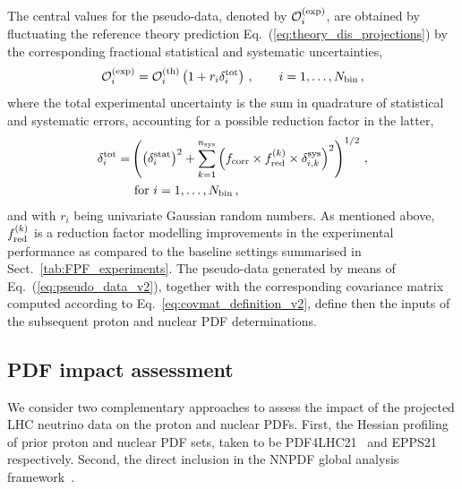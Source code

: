 The central values for the pseudo-data, denoted by $\mathcal{O}_i^{{\rm (exp)}} $, are obtained
by fluctuating the reference theory prediction Eq.~(\ref{eq:theory_dis_projections})
by the corresponding fractional statistical and systematic
uncertainties,
\begin{equation}
	\label{eq:pseudo_data_v2}
	\mathcal{O}_i^{{\rm (exp)}}
	= \mathcal{O}_i^{{\rm (th)}}
	\left( 1+ r_i \delta_i^{\rm tot}
	\right) \,
	, \qquad i=1,\ldots,N_{\rm bin} \, ,
\end{equation}
where the total experimental uncertainty is the sum in quadrature of
statistical and systematic errors, accounting for a possible reduction
factor in the latter,
\begin{align}
	\delta_{i}^{\rm tot}
	= & \left( \left( \delta_i^{\rm stat}\right)^2 + \sum_{k=1}^{n_{\rm sys}}
	\left( f_{\rm corr} \times f_{\rm red}^{(k)} \times \delta_{i,k}^{\rm sys} \right)^2\right)^{1/2} \, , \nonumber\\
	& \text{ for } i=1,\ldots,N_{\rm bin} \, ,
\end{align}
and with $r_{i}$ being univariate Gaussian random numbers. 
%
As mentioned above, $f_{\rm red}^{(k)}$ is a reduction factor modelling
improvements in the experimental performance as compared to the baseline
settings summarised in Sect.~\ref{tab:FPF_experiments}.
%
The pseudo-data generated by means of Eq.~(\ref{eq:pseudo_data_v2}),
together with the corresponding covariance matrix computed according to Eq.~\eqref{eq:covmat_definition_v2},
define then the inputs of the subsequent proton and nuclear PDF determinations.

 \subsection{PDF impact assessment}
 \label{subsec:pdf_impact_assessment}

We consider two complementary approaches to assess the
impact of the projected LHC neutrino data on the proton and nuclear PDFs.
%
First, the Hessian profiling\cite{Paukkunen:2014zia, Schmidt:2018hvu, AbdulKhalek:2018rok, HERAFitterdevelopersTeam:2015cre} of prior proton and
nuclear PDF sets, taken to be PDF4LHC21~\cite{PDF4LHCWorkingGroup:2022cjn} and
EPPS21~\cite{Eskola:2021nhw} respectively.
%
Second, the direct inclusion 
in the NNPDF global analysis framework~\cite{NNPDF:2021uiq,NNPDF:2021njg}.

